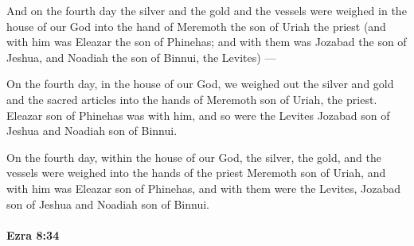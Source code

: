 			\begin{versebox}
					\item[BHS] 
					\item[LXX] 
					\item[ASV] And on the fourth day the silver and the gold and the vessels were weighed in the house of our God into the hand of Meremoth the son of Uriah the priest (and with him was Eleazar the son of Phinehas; and with them was Jozabad the son of Jeshua, and Noadiah the son of Binnui, the Levites) —
					\item[NIV] On the fourth day, in the house of our God, we weighed out the silver and gold and the sacred articles into the hands of Meremoth son of Uriah, the priest. Eleazar son of Phinehas was with him, and so were the Levites Jozabad son of Jeshua and Noadiah son of Binnui.
					\item[NRSV] On the fourth day, within the house of our God, the silver, the gold, and the vessels were weighed into the hands of the priest Meremoth son of Uriah, and with him was Eleazar son of Phinehas, and with them were the Levites, Jozabad son of Jeshua and Noadiah son of Binnui.
			\end{versebox}

		\paragraph{Ezra 8:34} %
			\label{EZRA-8-34}

